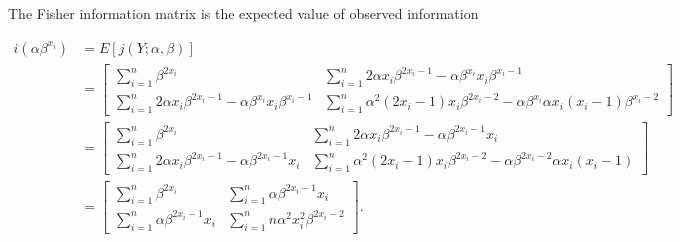 The Fisher information matrix is the expected value of observed information

\begin{align*}
    i\left(\alpha \beta^{x_i} \right) &= E\left[j(Y;\alpha ,\beta)\right]\\
    &= \begin{bmatrix} 
    \sum_{i = 1}^n \beta^{2x_i} 
    &
    \sum_{i = 1}^n 2\alpha x_i \beta^{2x_i - 1} - \alpha\beta^{x_i}x_i\beta^{x_i - 1}
    \\
    \sum_{i = 1}^n 2\alpha x_i \beta^{2x_i - 1} - \alpha\beta^{x_i}x_i\beta^{x_i - 1}
    &
    \sum_{i = 1}^n \alpha^2(2x_i - 1)x_i\beta^{2x_i - 2} - \alpha \beta^{x_i} \alpha x_i(x_i - 1) \beta^{x_i - 2}
    \end{bmatrix} \\
    &= \begin{bmatrix} 
    \sum_{i = 1}^n \beta^{2x_i}  
    &
     \sum_{i = 1}^n 2\alpha x_i \beta^{2x_i - 1} - \alpha\beta^{2x_i-1}x_i
    \\
    \sum_{i = 1}^n 2\alpha x_i \beta^{2x_i - 1} - \alpha\beta^{2x_i-1}x_i
    &
    \sum_{i = 1}^n \alpha^2(2x_i - 1)x_i\beta^{2x_i - 2} - \alpha \beta^{2x_i - 2} \alpha x_i(x_i - 1)
    \end{bmatrix}\\
    &= \begin{bmatrix} 
    \sum_{i = 1}^n \beta^{2x_i}  
    &
     \sum_{i = 1}^n  \alpha\beta^{2x_i-1}x_i
    \\
    \sum_{i = 1}^n  \alpha\beta^{2x_i-1}x_i
    &
    \sum_{i = 1}^n n\alpha^2 x_i^2 \beta^{2x_i - 2}
    \end{bmatrix}.  
\end{align*}

